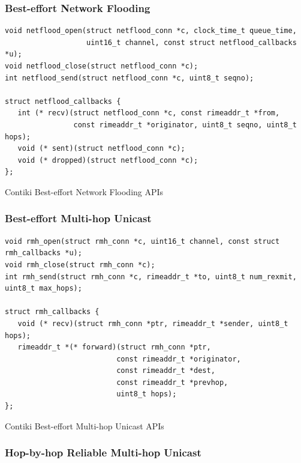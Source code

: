 \subsubsection{Best-effort Network Flooding}

\begin{listing}[H]
\begin{verbatim}
void netflood_open(struct netflood_conn *c, clock_time_t queue_time,
                   uint16_t channel, const struct netflood_callbacks *u);
void netflood_close(struct netflood_conn *c);
int netflood_send(struct netflood_conn *c, uint8_t seqno);

struct netflood_callbacks {
   int (* recv)(struct netflood_conn *c, const rimeaddr_t *from,
                const rimeaddr_t *originator, uint8_t seqno, uint8_t hops);
   void (* sent)(struct netflood_conn *c);
   void (* dropped)(struct netflood_conn *c);
};
\end{verbatim}
\caption{Contiki Best-effort Network Flooding APIs}
\end{listing}

\subsubsection{Best-effort Multi-hop Unicast}

\begin{listing}[H]
\begin{verbatim}
void rmh_open(struct rmh_conn *c, uint16_t channel, const struct rmh_callbacks *u);
void rmh_close(struct rmh_conn *c);
int rmh_send(struct rmh_conn *c, rimeaddr_t *to, uint8_t num_rexmit, uint8_t max_hops);

struct rmh_callbacks {
   void (* recv)(struct rmh_conn *ptr, rimeaddr_t *sender, uint8_t hops);
   rimeaddr_t *(* forward)(struct rmh_conn *ptr,
                          const rimeaddr_t *originator,
                          const rimeaddr_t *dest,
                          const rimeaddr_t *prevhop,
                          uint8_t hops);
};
\end{verbatim}
\caption{Contiki Best-effort Multi-hop Unicast APIs}
\end{listing}

\subsubsection{Hop-by-hop Reliable Multi-hop Unicast}

